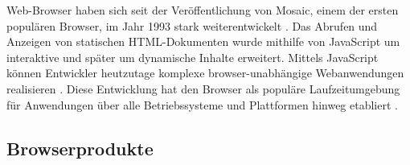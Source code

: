 Web-Browser haben sich seit der Veröffentlichung von Mosaic, einem der ersten populären Browser, im Jahr 1993 stark weiterentwickelt \cite{EvolutionOfTheWebBrowser}. Das Abrufen und Anzeigen von statischen HTML-Dokumenten wurde mithilfe von JavaScript um interaktive und später um dynamische Inhalte erweitert. Mittels JavaScript können Entwickler heutzutage komplexe browser-unabhängige Webanwendungen realisieren \cite{SinglePageApplication}. Diese Entwicklung hat den Browser als populäre Laufzeitumgebung für Anwendungen über alle Betriebssysteme und Plattformen hinweg etabliert \cite{TheWebAsAnApplicationPlatform}.

\subsection{Browserprodukte}
\label{sec:browserprodukte}



